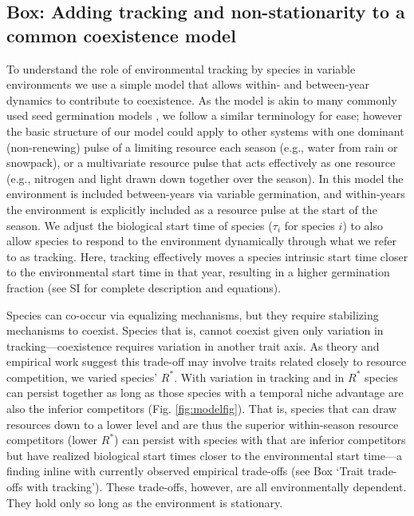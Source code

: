 \documentclass[11pt,letterpaper]{article}
\newcommand{\R}[1]{\label{#1}\linelabel{#1}}
\begin{document}
\subsection{Box: Adding tracking and non-stationarity to a common coexistence model} %
To understand the role of environmental tracking by species in variable environments we use a simple model that allows within- and between-year dynamics to contribute to coexistence. As the model is akin to many commonly used seed germination models \citep{Chesson:2004eo}, we follow a similar terminology for ease; however the basic structure of our model could apply to other systems with one dominant (non-renewing)  pulse of a limiting resource each season (e.g., water from rain or snowpack),\R{r2precip} or a multivariate resource pulse that acts effectively as one resource (e.g., nitrogen and light drawn down together over the season). In this model the environment is included between-years via variable germination, and within-years the environment is explicitly included as a resource pulse at the start of the season. We adjust the biological start time of species ($\tau_i$ for species $i$) to also allow species to respond to the environment dynamically through what we refer to as tracking. Here, tracking effectively moves a species intrinsic start time closer to the environmental start time in that year, resulting in a higher germination fraction (see SI for complete description and equations).

Species can co-occur via equalizing mechanisms, but they require stabilizing mechanisms to coexist. Species that is, cannot coexist given only variation in tracking---coexistence requires variation in another trait axis. As theory and empirical work suggest this trade-off may involve traits related closely to resource competition, we varied species' $R^*$. With variation in tracking and in $R^*$ species can persist together as long as those species with a temporal niche advantage are also the inferior competitors (Fig. \ref{fig:modelfig}). That is, species that can draw resources down to a lower level and are thus the superior within-season resource competitors (lower $R^*$) can persist with species with that are inferior competitors but have realized biological start times closer to the environmental start time---a finding inline with currently observed empirical trade-offs (see Box `Trait trade-offs with tracking'). These trade-offs, however, are all environmentally dependent. They hold only so long as the environment is stationary. 
\end{document}
